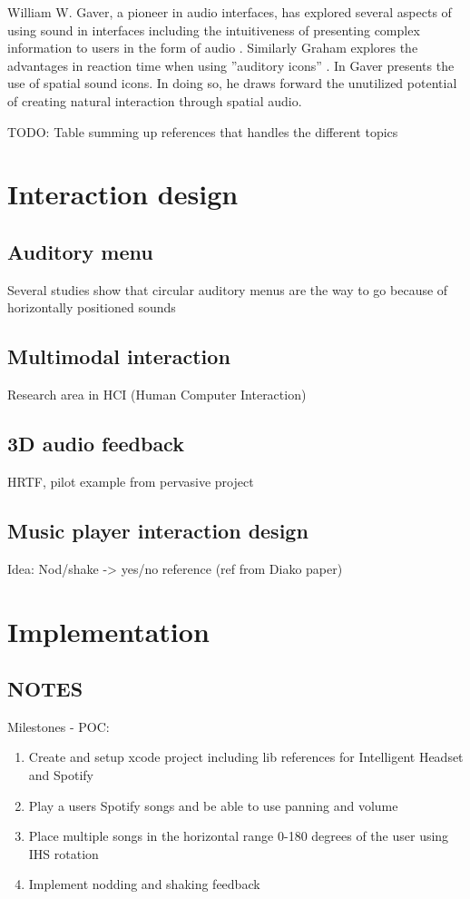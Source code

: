 \documentclass{article}
\begin{document}
William W. Gaver, a pioneer in audio interfaces, has explored several aspects of using sound in interfaces including the intuitiveness of presenting complex information to users in the form of audio \cite{gaver_sonicfinder:_1989}. Similarly Graham explores the advantages in reaction time when using ”auditory icons” \cite{graham_use_1999}. In \cite{gaver_auditory_1986} Gaver presents the use of spatial sound icons. In doing so, he draws forward the unutilized potential of creating natural interaction through spatial audio.

TODO: Table summing up references that handles the different topics


\section{Interaction design}

\subsection{Auditory menu}
Several studies show that circular auditory menus are the way to go because of horizontally positioned sounds 

\subsection{Multimodal interaction}
Research area in HCI (Human Computer Interaction)

\subsection{3D audio feedback}
HRTF, pilot example from pervasive project

\subsection{Music player interaction design}
Idea: Nod/shake -> yes/no reference (ref from Diako paper)


\section{Implementation}

\subsection{NOTES}

Milestones - POC:
\begin{enumerate}
\item Create and setup xcode project including lib references for Intelligent Headset and Spotify
\item Play a users Spotify songs and be able to use panning and volume
\item Place multiple songs in the horizontal range 0-180 degrees of the user using IHS rotation
\item Implement nodding and shaking feedback
\end{enumerate}
\end{document}

